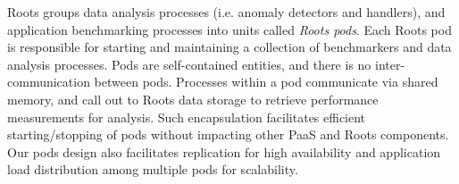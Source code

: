 
Roots groups data analysis processes (i.e. anomaly detectors and handlers), 
and application benchmarking processes into units called \textit{Roots pods}. 
Each Roots pod is responsible for starting and maintaining a collection of
benchmarkers and data analysis processes. 
Pods are self-contained entities, and there is no inter-communication
between pods. 
Processes within a pod communicate via 
shared memory, and call out to Roots data storage to retrieve 
performance measurements for analysis. Such encapsulation facilitates 
efficient starting/stopping of pods 
without impacting other PaaS and Roots components. Our pods design also facilitates
replication for high availability and application load distribution
among multiple pods for scalability.


